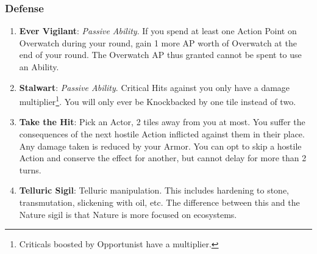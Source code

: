 \subsubsection{Defense}
\begin{enumerate}
    \item \textbf{Ever Vigilant}: \textit{Passive Ability}. If you spend at least one Action Point on Overwatch during your round, gain 1 more AP worth of Overwatch at the end of your round. The Overwatch AP thus granted cannot be spent to use an Ability.
    \item \textbf{Stalwart}: \textit{Passive Ability}. Critical Hits against you only have a  damage multiplier\footnote{Criticals boosted by Opportunist have a  multiplier.}. You will only ever be Knockbacked by one tile instead of two.
    \item \textbf{Take the Hit}: Pick an Actor, 2 tiles away from you at most. You suffer the consequences of the next hostile Action inflicted against them in their place. Any damage taken is reduced by your Armor. You can opt to skip a hostile Action and conserve the effect for another, but cannot delay for more than 2 turns.
    \item \textbf{Telluric Sigil}: Telluric manipulation. This includes hardening to stone, transmutation, slickening with oil, etc. The difference between this and the Nature sigil is that Nature is more focused on ecosystems.
\end{enumerate}

